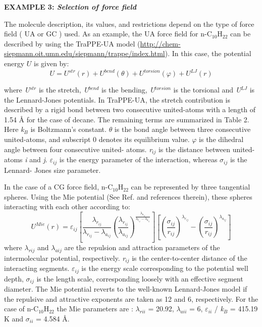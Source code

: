 \documentclass[9pt,bestpractices]{livecoms}
\begin{document}
\begin{mdframed}[linewidth=0pt,backgroundcolor=LiveCoMSLightBlue!8,fontcolor=LiveCoMSDarkBlue!80!black]
  \textbf{EXAMPLE 3: \textit{Selection of force field}}

The molecule description, its values, and restrictions depend on the type of
force field ( UA or GC ) used. As an example, the UA force field for
n-C$_{10}$H$_{22}$ can be described by using the TraPPE-UA model (\url{http://chem-siepmann.oit.umn.edu/siepmann/trappe/index.html}).
In this case, the potential energy $U$ is given by:
\begin{equation}
U=U^{str}\left(r\right)+U^{bend}\left(\theta\right)+U^{torsion}\left(\varphi\right)+U^{LJ}\left(r\right)
\end{equation}

where \textit{U}$^{str}$ is the stretch, \textit{U}$^{bend}$ is the bending,
\textit{U}$^{torsion}$ is the torsional and \textit{U}$^{LJ}$ is the
Lennard-Jones potentials. In TraPPE-UA, the stretch contribution is described
by a rigid bond between two consecutive united-atoms with a length of 1.54
\AA{} for the case of decane. The remaining terms are summarized in Table 2.
Here \textit{k}$_{B}$ is Boltzmann's constant. ${\theta}$ is the bond angle between
three consecutive united-atoms, and subscript 0 denotes its equilibrium value.
${\varphi}$ is the dihedral angle between four consecutive united- atoms.
\textit{r}$_{ij}$ is the distance between united-atoms \textit{i} and
\textit{j}. ${\varepsilon}$$_{ij}$ is the energy parameter of the interaction,
whereas ${\sigma}$$_{ij}$ is the Lennard- Jones size parameter. 

In the case of a CG force field, n-C$_{10}$H$_{22}$ can be represented by three
tangential spheres. Using the Mie potential (See Ref. \citep{muller2014} and
references therein), these spheres interacting with each other according to:
\begin{equation}
U^{Mie}\left(r\right)=\varepsilon_{ij}\left[\frac{\lambda_{r_{ij}}}{\lambda_{r_{ij}}-\lambda_{a_{ij}}}\left(\frac{\lambda_{r_{ij}}}{\lambda_{a_{ij}}}\right)^{\frac{\lambda_{a_{ij}}}{\lambda_{r_{ij}}-\lambda_{a_{ij}}}}\right]\left[\left(\frac{\sigma_{ij}}{r_{ij}}\right)^{\lambda_{r_{ij}}}-\left(\frac{\sigma_{ij}}{r_{ij}}\right)^{\lambda_{a_{ij}}}\right]
\end{equation}
where {${\lambda}$}$_{rij}$ and {${\lambda}$}$_{aij}$ are the repulsion and
attraction parameters of the intermolecular potential, respectively.
\textit{r}$_{ij}$ is the center-to-center distance of the interacting segments.
${\varepsilon}$$_{ij}$ is the energy scale corresponding to the potential well
depth, ${\sigma}$$_{ij}$ is the length scale, corresponding loosely with an
effective segment diameter. The Mie potential reverts to the well-known
Lennard-Jones model if the repulsive and attractive exponents are taken as 12
and 6, respectively. For the case of n-C$_{10}$H$_{22}$ the Mie parameters are
\citep{mejia2014a}:
{${\lambda}$}$_{rii}$ = 20.92, {${\lambda}$}$_{aii}$ = 6,
${\varepsilon}$$_{ii}$ / \textit{k}$_{B}$ = 415.19 K and ${\sigma}$$_{ii}$
= 4.584 \AA{}.


\end{mdframed}
\end{document}
